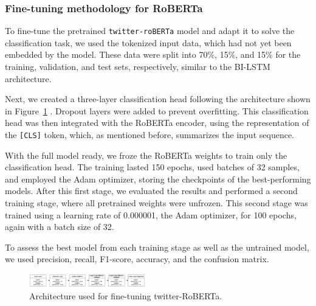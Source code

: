 \subsubsection{Fine-tuning methodology for RoBERTa}

To fine-tune the pretrained \texttt{twitter-roBERTa} model and adapt it to solve the classification task, we used the tokenized input data, which had not yet been embedded by the model. These data were split into 70\%, 15\%, and 15\% for the training, validation, and test sets, respectively, similar to the BI-LSTM architecture. 

Next, we created a three-layer classification head following the architecture shown in Figure~\ref{fig:roberta_finetune_architecture} \cite{liu2019roberta}. Dropout layers were added to prevent overfitting. This classification head was then integrated with the RoBERTa encoder, using the representation of the \texttt{[CLS]} token, which, as mentioned before, summarizes the input sequence.

With the full model ready, we froze the RoBERTa weights to train only the classification head. The training lasted 150 epochs, used batches of 32 samples, and employed the Adam optimizer, storing the checkpoints of the best-performing models. After this first stage, we evaluated the results and performed a second training stage, where all pretrained weights were unfrozen. This second stage was trained using a learning rate of 0.000001, the Adam optimizer, for 100 epochs, again with a batch size of 32.

To assess the best model from each training stage as well as the untrained model, we used precision, recall, F1-score, accuracy, and the confusion matrix.

\begin{figure}[htbp]
  \centering
  \includegraphics[width=0.45\textwidth]{images/roberta_finetune_architecture.png}
  \caption{Architecture used for fine-tuning twitter-RoBERTa.}
  \label{fig:roberta_finetune_architecture}
\end{figure}
